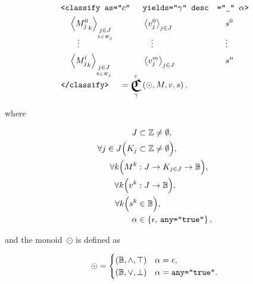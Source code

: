\begin{axiom}
\indexsym{}
\indexsym{}
\begin{alignat}{3}
    &\xml{<classify as="$c$" }&&\xml{yields="$\gamma$" desc}&&\xml{="$\_$"
          $\alpha$>}\label{eq:xml-classify} \\
    &\quad \MFam{M^0}jJkK   &&\VFam{v^0}jJ   &&\quad s^0    \nonumber\\[-4mm]
    &\quad \quad\vdots      &&\quad\vdots    &&\quad \vdots \nonumber\\
    &\quad \MFam{M^l}jJkK   &&\VFam{v^m}jJ   &&\quad s^n    \nonumber\\[-3mm]
    &\xml{</classify>}
      &&\mspace{-50mu}= \Classify^c_\gamma\left(\odot,M,v,s\right), \nonumber
\end{alignat}

\noindent
where

\indexsym{}
\begin{align}
    J &\subset\mathbb{Z} \neq\emptyset, \\
    \forall{j\in J}\Big(K_j &\subset\mathbb{Z} \neq\emptyset\Big), \\
    \forall{k}\Big(M^k &: J \rightarrow K_{j\in J} \rightarrow \mathbb{B}\Big),
                                            \label{eq:class-matrix} \\
    \forall{k}\Big(v^k &: J \rightarrow \mathbb{B}\Big), \\
    \forall{k}\Big(s^k &\in\mathbb{B}\Big), \\
    \alpha &\in\left\{\epsilon,\, \texttt{any="true"}\right\}, \label{eq:xml-any-domain}
\end{align}

\noindent
and the monoid~$\odot$ is defined as

\indexsym{}
\begin{equation}\label{eq:classify-rel}
  \odot = \begin{cases}
        \left({\mathbb{B}},{\land},{\top}\right) &\alpha = \epsilon,\\
        \left({\mathbb{B}},{\lor},{\bot}\right) &\alpha = \texttt{any="true"}.
      \end{cases}
\end{equation}
\end{axiom}



